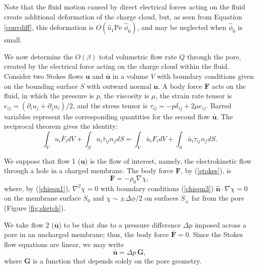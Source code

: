 Note that the fluid motion caused by direct electrical forces acting on the fluid  create additional deformation of the charge cloud, but, as seen from Equation \ref{convdiff}, this deformation is $O({\hat u}_1 \text{Pe}\; \hat\phi_0)$, and may be neglected when
$\hat\phi_0$ is small. 

We now determine the $O(\beta)$ total volumetric flow rate $Q$ through the pore, created by the electrical force acting on the charge cloud within the fluid. Consider two Stokes flows $\mathbf{u}$ and $\bar{\mathbf{u}}$ in a volume $V$ with boundary conditions given on the bounding surface $S$
with outward normal $\mathbf{n}$. A body force $\mathbf{F}$ acts on the fluid, in which the pressure is $p$, the viscosity is $\mu$, the strain rate tensor is $e_{ij}=(\partial_iu_j+\partial_ju_i)/2$, and the stress tensor is $\tau_{ij}= - p \delta_{ij} + 2\mu e_{ij}$. Barred variables represent the corresponding quantities for the second flow $\bar{\mathbf{u}}$. The reciprocal theorem \cite{Happel&Brenner} gives the identity:
\begin{equation}
\int_V u_i \bar{F}_i dV + \int_S u_i \bar{\tau}_{ij} n_j dS = \int_V
\bar{u}_i F_i  dV + \int_S \bar{u}_i \tau_{ij} n_j dS.
\label{eq:recTheo}
\end{equation}

We suppose that flow 1 ($\mathbf{u}$)  is the flow of interest, namely, the electrokinetic flow through a hole in a charged membrane. The body force $\mathbf{F}$, by (\ref{stokes}), is
\begin{equation} 
\mathbf{F} = -\rho_0\nabla\chi,
\label{eq:forceF}
\end{equation} 
where, by (\ref{chieqn1}), $\nabla^2 \chi = 0$ with boundary conditions (\ref{chieqn3})
$\hat{\mathbf{n}} \cdot \nabla \chi = 0$ on the membrane surface $S_0$ and  $\chi \sim \pm \Delta \phi / 2$ on surfaces $S_{\pm}$ far from the pore (Figure \ref{fig:sketch}).

We take flow 2 ($\bar{\mathbf{u}}$) to be that due to a pressure difference $\Delta p$ imposed across a pore in an uncharged membrane; thus, the body force $\bar{\mathbf{F}}=0$. Since the Stokes flow equations are linear, we may write 
\begin{equation} 
\bar{\mathbf{u}} = \Delta p\, \mathbf{G},
\label{eq:defineG}
\end{equation} 
where $\mathbf{G}$ is a function that depends solely on the pore geometry. 

